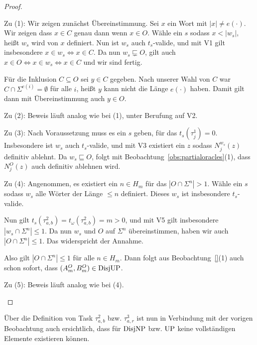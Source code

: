 \begin{proof}
    \begin{prooflist}
    \item Zu (1): Wir zeigen zunächst Übereinstimmung. Sei $x$ ein Wort mit $|x|\neq e(\cdot)$. Wir zeigen dass $x\in C$ genau dann wenn $x\in O$. Wähle ein $s$ sodass $x<|w_s|$, heißt $w_s$ wird von $x$ definiert. Nun ist $w_s$ auch $t_s$-valide, und mit V1 gilt insbesondere $x\in w_s \iff x\in C$.
        Da nun $w_s\sqsubsetneq O$, gilt auch $x\in O \iff x\in w_s \iff x\in C$ und wir sind fertig.

        Für die Inklusion $C\subseteq O$ sei $y\in C$ gegeben. Nach unserer Wahl von $C$ war $C\cap\Sigma^{e(i)}=\emptyset$ für alle $i$, heißt $y$ kann nicht die Länge $e(\cdot)$ haben.
        Damit gilt dann mit Übereinstimmung auch $y\in O$.
        
    \item Zu (2): Beweis läuft analog wie bei (1), unter Berufung auf V2.

    \item Zu (3): Nach Voraussetzung muss es ein $s$ geben, für das $t_s(\tau^1_j)=0$. Insbesondere ist $w_s$ auch $t_s$-valide, und mit V3 existiert ein $z$ sodass $N_j^{w_s}(z)$ definitiv ablehnt.
        Da $w_s\sqsubseteq O$, folgt mit Beobachtung~\ref{obs:partialoracles}(1), dass $N_j^O(z)$ auch definitiv ablehnen wird.

    \item Zu (4): Angenommen, es existiert ein $n\in H_m$ für das $|O\cap\Sigma^n|>1$.
        Wähle ein $s$ sodass $w_s$ alle Wörter der Länge $\leq n$ definiert. Dieses $w_s$ ist insbesondere $t_s$-valide.

        Nun gilt $t_s(\tau^2_{a,b})=t_\omega(\tau^2_{a,b})=m>0$, und mit V5 gilt insbesondere $|w_s\cap\Sigma^n|\leq 1$.
        Da nun $w_s$ und $O$ auf $\Sigma^{n}$ übereinstimmen, haben wir auch $|O\cap\Sigma^n|\leq 1$. Das widerspricht der Annahme.

        Also gilt $|O\cap\Sigma^n|\leq 1$ für alle $n\in H_m$. Dann folgt aus Beobachtung~\ref{}(1) auch schon sofort, dass $(A_m^O, B_m^O)\in\mathrm{DisjUP}$.

    \item Zu (5): Beweis läuft analog wie bei (4).
    \end{prooflist}
\end{proof}

Über die Definition von Task $\tau^2_{a,b}$ bzw. $\tau^3_{a,r}$ ist nun in Verbindung mit der vorigen Beobachtung auch ersichtlich, dass für $\mathrm{DisjNP}$ bzw. $\mathrm{UP}$ keine vollständigen Elemente existieren können.

